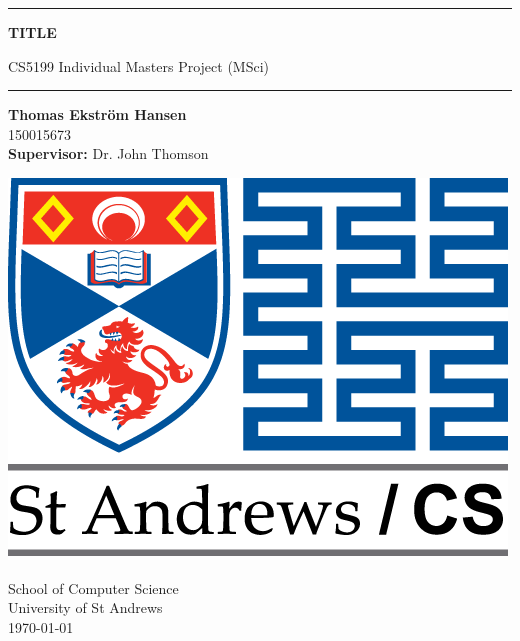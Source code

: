 \begin{titlepage}
    \begin{center}
        \vspace*{1cm}
        
        {\rule{0.9\textwidth}{0.5mm}}
        
        \Huge
        \textbf{TITLE}
        
        \LARGE
        CS5199 Individual Masters Project (MSci)
        
        {\noindent \hspace*{-0.65cm} \rule[0.3cm]{1.08\textwidth}{0.5mm}}
        
        \vspace{1.5cm}
        
        \sffamily
        \Large
        \textbf{Thomas Ekstr{\" o}m Hansen}\\150015673
        \\
        \textbf{Supervisor:} Dr. John Thomson
        \Large
        \rmfamily
        
        \vfill
        
        \includegraphics[width=0.4\linewidth]{titlepage/logo-uni-cs-mintext-long.png}
        
        \vspace{1.5cm}
        
        School of Computer Science
        \\
        University of St Andrews
        \\
        \vspace{3mm}
        \today
    \end{center}
\end{titlepage}